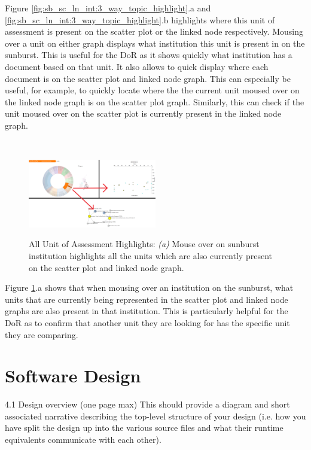 \documentclass[a4paper, 11pt]{article}
\begin{document}
\noindent Figure \ref{fig:sb_sc_ln_int:3_way_topic_highlight}.a and \ref{fig:sb_sc_ln_int:3_way_topic_highlight}.b highlights where this unit of assessment is present on the scatter plot or the linked node respectively. Mousing over a unit on either graph displays what institution this unit is present in on the sunburst. This is useful for the DoR as it shows quickly what institution has a document based on that unit. It also allows to quick display where each document is on the scatter plot and linked node graph. This can especially be useful, for example, to quickly locate where the the current unit moused over on the linked node graph is on the scatter plot graph. Similarly, this can check if the unit moused over on the scatter plot is currently present in the linked node graph. 

\\

\begin{figure}[hbt!]
	\centering
      \includegraphics[width=0.5\textwidth]{imgs/sb_sc_ln_int/topics_in_current_and_in_highlighted.png} \\
	\caption{All Unit of Assessment Highlights: 
	\textit{(a)} Mouse over on sunburst institution highlights all the units which are also currently present on the scatter plot and linked node graph.}
    \label{fig:sb_sc_ln_int:topics_in_cur_mouse}
     \noindent\makebox[\linewidth]{\rule{\textwidth}{0.4pt}}
\end{figure}

\noindent Figure \ref{fig:sb_sc_ln_int:topics_in_cur_mouse}.a shows that when mousing over an institution on the sunburst, what units that are currently being represented in the scatter plot and linked node graphs are also present in that institution. This is particularly helpful for the DoR as to confirm that another unit they are looking for has the specific unit they are comparing.



\newpage
\section{Software Design}
4.1 Design overview (one page max)
This should provide a diagram and short associated narrative describing the top-level structure of your design (i.e. how you have split the design up into the various source files and what their runtime equivalents communicate with each other).
\end{document}
